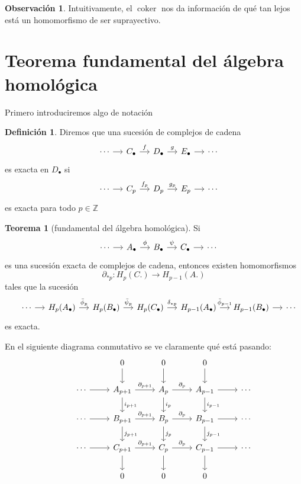 \documentclass[spanish]{book}
\theoremstyle{definition}
\newtheorem*{defn}{Definición}
\newtheorem*{obs}{Observación}
\newtheorem*{teo}{Teorema}
\newcommand{\Z}{\mathbb{Z}}
\DeclareMathOperator{\coker}{coker}
\begin{document}
	\begin{obs}
		Intuitivamente, el $\coker$ nos da información de qué tan lejos está un homomorfismo de ser suprayectivo.
	\end{obs}
\section{Teorema fundamental del álgebra homológica}
	Primero introduciremos algo de notación
	\begin{defn}
		Diremos que una sucesión de complejos de cadena
		\[\begin{tikzcd}[column sep=small]
			&\cdots\arrow{r}&C_\bullet\arrow{r}{f}&D_\bullet\arrow{r}{g}&E_\bullet\arrow{r}&\cdots
		\end{tikzcd}\]
		es exacta en $D_\bullet$ si 
		\[\begin{tikzcd}[column sep=small]
			&\cdots\arrow{r}&C_p\arrow{r}{f_p}&D_p\arrow{r}{g_p}&E_p\arrow{r}&\cdots
		\end{tikzcd}\]
		es exacta para todo $p\in\Z$
	\end{defn}
	\begin{teo}[fundamental del álgebra homológica]
		Si 
		\[\begin{tikzcd}[column sep=small]
			&\cdots\arrow{r}&A_\bullet\arrow{r}{\phi}&B_\bullet\arrow{r}{\psi}&C_\bullet\arrow{r}&\cdots
		\end{tikzcd}\]
		es una sucesión exacta de complejos de cadena, entonces existen homomorfismos \[\partial_{*p}:H_p(C.)\to H_{p-1}(A.)\]
		tales que la sucesión
		\[\begin{tikzcd}[column sep=small]
			&\cdots\arrow{r}&H_p(A_\bullet)\arrow{r}{\bar\phi_p}&H_p(B_\bullet)\arrow{r}{\bar\psi_p}&H_p(C_\bullet)\arrow{r}{\delta_{*p}}&H_{p-1}(A_\bullet)\arrow{r}{\bar\phi_{p-1}}&H_{p-1}(B_\bullet)\arrow{r}&\cdots
		\end{tikzcd}\]
		es exacta.
	\end{teo}
	En el siguiente diagrama conmutativo se ve claramente qué está pasando:
	\[
	\begin{tikzcd}
		& & 0 \arrow{d} & 0 \arrow{d} & 0 \arrow{d} & \\
		& \cdots \arrow{r} & A_{p+1} \arrow{r}{\partial_{p+1}} \arrow{d}{i_{p+1}} & A_p \arrow{r}{\partial_p} \arrow{d}{i_p} & A_{p-1} \arrow{r} \arrow{d}{i_{p-1}} & \cdots \\
		& \cdots \arrow{r} & B_{p+1} \arrow{r}{\partial_{p+1}} \arrow{d}{j_{p+1}} & B_p \arrow{r}{\partial_p} \arrow{d}{j_p} & B_{p-1} \arrow{r} \arrow{d}{j_{p-1}} & \cdots \\
		& \cdots \arrow{r} & C_{p+1} \arrow{r}{\partial_{p+1}} \arrow{d} & C_p \arrow{r}{\partial_p} \arrow{d} & C_{p-1} \arrow{r} \arrow{d} & \cdots \\
		& & 0 & 0 & 0 & \\
	\end{tikzcd}
	\]
\end{document}
